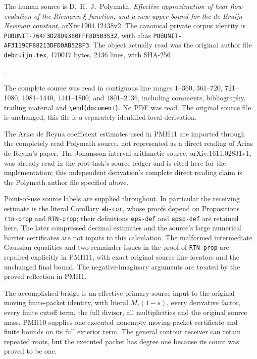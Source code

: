 The human source is D.~H.~J.~Polymath,
\emph{Effective approximation of heat flow evolution of the Riemann
$\xi$ function, and a new upper bound for the de Bruijn--Newman
constant}, arXiv:1904.12438v2. The canonical private corpus identity
is \texttt{PUBUNIT-764F3D28D9380FFF8D503532}, with alias
\texttt{PUBUNIT-AF3119CF88213DFD0AB52BF3}. The object actually read
was the original author file \texttt{debruijn.tex}, 170017 bytes,
2136 lines, with SHA-256
\begin{center}\small\ttfamily
{}.
\end{center}
The complete source was read in contiguous line ranges 1--360,
361--720, 721--1080, 1081--1440, 1441--1800, and 1801--2136,
including comments, bibliography, trailing material and
\texttt{\textbackslash end\{document\}}. No PDF was read. The original source file is
unchanged; this file is a separately identified local derivation.

The Arias de Reyna coefficient estimates used in PMH11 are imported
through the completely read Polymath source, not represented as a
direct reading of Arias de Reyna's paper. The Johansson interval
arithmetic source, arXiv:1611.02831v1, was already read in the root
task's source ledger and is cited here for the implementation;
this independent derivation's complete direct reading claim is
the Polymath author file specified above.

Point-of-use source labels are supplied throughout. In particular
the receiving estimate is the literal Corollary \texttt{ab-cor},
whose proofs depend on Propositions \texttt{rtn-prop} and
\texttt{RTN-prop}; their definitions \texttt{eps-def} and
\texttt{epsp-def} are retained here. The later compressed decimal
estimates and the source's large numerical barrier certificates
are not inputs to this calculation. The malformed intermediate
Gaussian equalities and two remainder issues in the proof of
\texttt{RTN-prop} are repaired explicitly in PMH11, with exact
original-source line locators and the unchanged final bound.
The negative-imaginary
arguments are treated by the proved reflection in PMH1.

The accomplished bridge is an effective primary-source input to
the original moving finite-packet identity, with literal
$M_t(1-s)$, every derivative factor, every finite cutoff term,
the full divisor, all multiplicities and the original source mass.
PMH10 supplies one executed nonempty moving-packet certificate and
finite bounds on its full exterior term. The general contour
receiver can retain repeated roots, but the executed packet has
degree one because its count was proved to be one.

